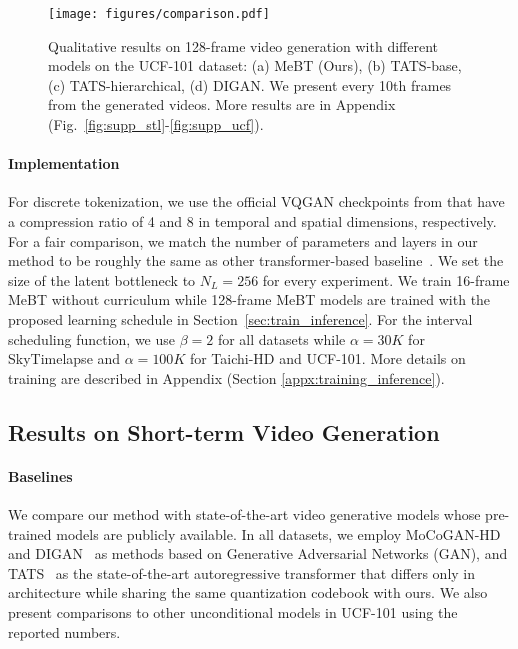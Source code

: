 \documentclass[10pt,twocolumn,letterpaper]{article}
\begin{document}
\begin{figure*}[!ht]
    \begin{minipage}{\textwidth}
    \centering
    \texttt{[image: figures/comparison.pdf]} \vspace{-0.5cm}
\captionsetup{type=figure}
    \vspace{-0.2cm}
    \caption{Qualitative results on 128-frame video generation with different models on the UCF-101 dataset: (a) MeBT (Ours), (b) TATS-base, (c) TATS-hierarchical, (d) DIGAN. 
We present every 10th frames from the generated videos.
More results are in Appendix (Fig.~\ref{fig:supp_stl}-\ref{fig:supp_ucf}).
    }
    \label{fig:longterm_qualitative}
    \end{minipage}
    \vspace{-0.6cm}
\end{figure*}
\vspace{-0.4cm}
\paragraph{Implementation}
For discrete tokenization, we use the official VQGAN checkpoints from \cite{TATS} that have a compression ratio of 4 and 8 in temporal and spatial dimensions, respectively.
For a fair comparison, we match the number of parameters and layers in our method to be roughly the same as other transformer-based baseline~\cite{TATS}.
We set the size of the latent bottleneck to $N_L=256$ for every experiment.
We train 16-frame MeBT without curriculum while 128-frame MeBT models are trained with the proposed learning schedule in Section~\ref{sec:train_inference}. 
For the interval scheduling function, we use $\beta = 2$ for all datasets while $\alpha = 30K$ for SkyTimelapse and $\alpha = 100K$ for Taichi-HD and UCF-101. 
More details on training are described in Appendix (Section \ref{appx:training_inference}).

\subsection{Results on Short-term Video Generation}
\paragraph{Baselines}
We compare our method with state-of-the-art video generative models whose pre-trained models are publicly available.
In all datasets, we employ MoCoGAN-HD~\cite{MoCoGAN-HD} and DIGAN~\cite{DIGAN} as methods based on Generative Adversarial Networks (GAN), and TATS~\cite{TATS} as the state-of-the-art autoregressive transformer that differs only in architecture while sharing the same quantization codebook with ours.
We also present comparisons to other unconditional models in UCF-101 using the reported numbers.
\end{document}
